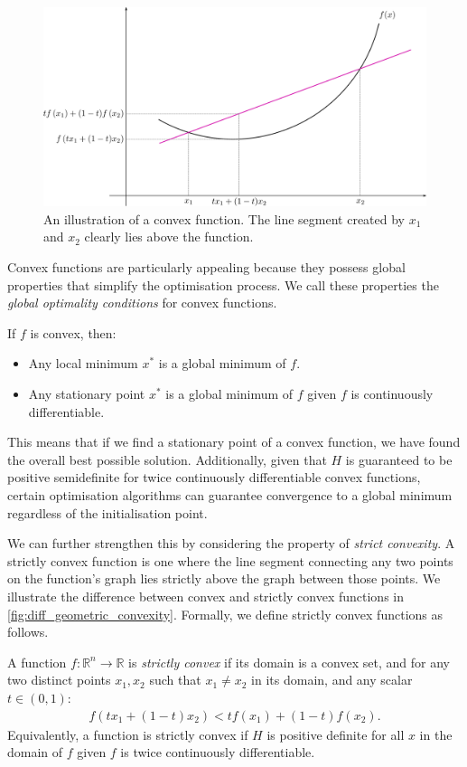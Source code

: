 \begin{figure}[h]
    \centering
    \includegraphics[width=0.7\linewidth]{figures/2background/convex_function.svg.png}
    \caption{An illustration of a convex function. The line segment created by $x_1$ and $x_2$ clearly lies above the function.}
    \label{fig:convex_function}
\end{figure}

Convex functions are particularly appealing because they possess global properties that simplify the optimisation process. We call these properties the \textit{global optimality conditions} for convex functions.

\begin{definition}
    If $f$ is convex, then: 
    \begin{itemize}
        \item Any local minimum $x^*$ is a global minimum of $f$.
        \item Any stationary point $x^*$ is a global minimum of $f$ given $f$ is continuously differentiable.
    \end{itemize}
\end{definition}

This means that if we find a stationary point of a convex function, we have found the overall best possible solution. Additionally, given that $H$ is guaranteed to be positive semidefinite for twice continuously differentiable convex functions, certain optimisation algorithms can guarantee convergence to a global minimum regardless of the initialisation point. 

We can further strengthen this by considering the property of \textit{strict convexity}. A strictly convex function is one where the line segment connecting any two points on the function's graph lies strictly above the graph between those points. We illustrate the difference between convex and strictly convex functions in \cref{fig:diff_geometric_convexity}. Formally, we define strictly convex functions as follows.
\begin{definition}
    A function $f: \mathbb{R}^n \to \mathbb{R}$ is \textit{strictly convex} if its domain is a convex set, and for any two distinct points $x_1, x_2$ such that $x_1 \neq x_2$ in its domain, and any scalar $t \in (0, 1)$:
    \begin{align}
        f(t x_1 + (1-t)x_2) < t f(x_1) + (1-t)f(x_2).
    \end{align}
    Equivalently, a function is strictly convex if $H$ is positive definite for all $x$ in the domain of $f$ given $f$ is twice continuously differentiable.
\end{definition}

